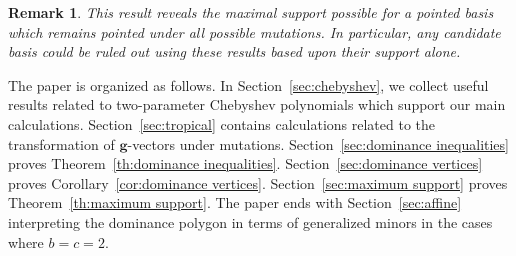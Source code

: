 \documentclass{amsart}
\newtheorem{remark}[theorem]{Remark}
\numberwithin{theorem}{section}
\newcommand{\bfg}{\boldsymbol{g}}
\begin{document}
\begin{figure}[h!]
\end{figure}

\begin{remark}
  This result reveals the maximal support possible for a pointed basis which remains pointed under all possible mutations.
  In particular, any candidate basis could be ruled out using these results based upon their support alone.
\end{remark}

The paper is organized as follows.
In Section~\ref{sec:chebyshev}, we collect useful results related to two-parameter Chebyshev polynomials which support our main calculations.
Section~\ref{sec:tropical} contains calculations related to the transformation of $\bfg$-vectors under mutations.
Section~\ref{sec:dominance inequalities} proves Theorem~\ref{th:dominance inequalities}.
Section~\ref{sec:dominance vertices} proves Corollary~\ref{cor:dominance vertices}.
Section~\ref{sec:maximum support} proves Theorem~\ref{th:maximum support}.
The paper ends with Section~\ref{sec:affine} interpreting the dominance polygon in terms of generalized minors in the cases where $b=c=2$.
\end{document}
